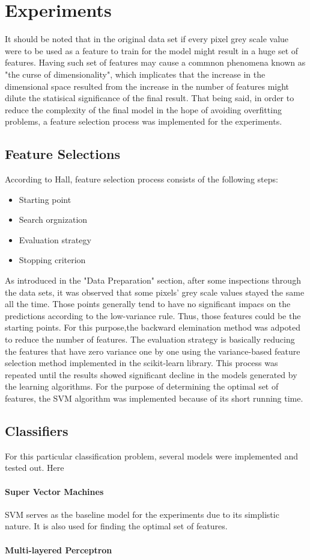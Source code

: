 
\section{Experiments}
\label{sec:expts}
It should be noted that in the original data set if every pixel grey scale value were to be used as a feature to train for the model might result in a huge set of features. Having such set of features may cause a commnon phenomena known as "the curse of dimensionality", which implicates that the increase in the dimensional space resulted from the increase in the number of features might dilute the statisical significance of the final result.\cite{bellman}
That being said, in order to reduce the complexity of the final model in the hope of avoiding overfitting problems, a feature selection process was implemented for the experiments.\cite{hall}
\subsection{Feature Selections}
\label{feature}
According to Hall, feature selection process consists of the following steps:
\begin{itemize}
	\item Starting point
	\item Search orgnization
	\item Evaluation strategy
	\item Stopping criterion

\end{itemize}
As introduced in the "Data Preparation" section, after some inspections through the data sets, it was observed that some pixels' grey scale values stayed the same all the time. Those points generally tend to have no significant impacs on the predictions according to the low-variance rule. Thus, those features could be the starting points. For this purpose,the backward elemination method was adpoted to reduce the number of features.\cite{hall}
The evaluation strategy is basically reducing the features that have zero variance one by one  using the variance-based feature selection method implemented in the scikit-learn library. This process was repeated until the results showed significant decline in the models generated by the learning algorithms. For the purpose of determining the optimal set of features, the SVM algorithm was implemented because of its short running time.

\subsection{Classifiers}
\label{class}
For this particular classification problem, several models were implemented and tested out. Here
\paragraph{Super Vector Machines}
SVM serves as the baseline model for the experiments due to its simplistic nature. It is also used for finding the optimal set of features.
\paragraph{Multi-layered Perceptron}

